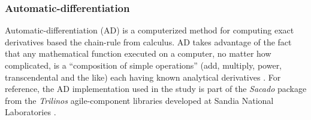 \documentclass[preprint,12pt]{elsarticle}
\begin{document}
\subsubsection{Automatic-differentiation} 
\label{ADsubsection}

Automatic-differentiation (AD) is a computerized method for computing exact derivatives based the chain-rule from calculus. AD takes advantage of the fact that any mathematical function executed on a computer, no matter how complicated, is a ``composition of simple operations'' (add, multiply, power, transcendental and the like) each having known analytical derivatives \cite{ref-sacado-presentation}. For reference, the AD implementation used in the study is part of the \emph{Sacado} package from the \emph{Trilinos} agile-component libraries developed at Sandia National Laboratories \cite{ref-Sacado}.
\end{document}

